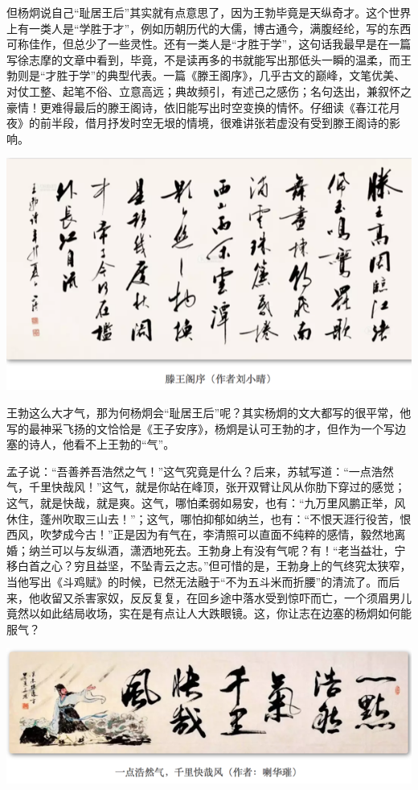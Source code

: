 \documentclass[]{book}
\begin{document}
但杨炯说自己``耻居王后''其实就有点意思了，因为王勃毕竟是天纵奇才。这个世界上有一类人是``学胜于才''，例如历朝历代的大儒，博古通今，满腹经纶，写的东西可称佳作，但总少了一些灵性。还有一类人是``才胜于学''，这句话我最早是在一篇写徐志摩的文章中看到，毕竟，不是读再多的书就能写出那低头一瞬的温柔，而王勃则是``才胜于学''的典型代表。一篇《滕王阁序》，几乎古文的巅峰，文笔优美、对仗工整、起笔不俗、立意高远；典故频引，有述己之感伤；名句迭出，兼叙怀之豪情！更难得最后的滕王阁诗，依旧能写出时空变换的情怀。仔细读《春江花月夜》的前半段，借月抒发时空无垠的情境，很难讲张若虚没有受到滕王阁诗的影响。

\includegraphics[width=8.33in]{images/ctsj5}

王勃这么大才气，那为何杨炯会``耻居王后''呢？其实杨炯的文大都写的很平常，他写的最神采飞扬的文恰恰是《王子安序》，杨炯是认可王勃的才，但作为一个写边塞的诗人，他看不上王勃的``气''。

孟子说：``吾善养吾浩然之气！''这气究竟是什么？后来，苏轼写道：``一点浩然气，千里快哉风！''这气，就是你站在峰顶，张开双臂让风从你肋下穿过的感觉；这气，就是快哉，就是爽。这气，哪怕柔弱如易安，也有：``九万里风鹏正举，风休住，蓬州吹取三山去！''；这气，哪怕抑郁如纳兰，也有：``不恨天涯行役苦，恨西风，吹梦成今古！''正是因为有气在，李清照可以直面不纯粹的感情，毅然地离婚；纳兰可以与友纵酒，潇洒地死去。王勃身上有没有气呢？有！``老当益壮，宁移白首之心？穷且益坚，不坠青云之志。''但可惜的是，王勃身上的气终究太狭窄，当他写出《斗鸡赋》的时候，已然无法融于``不为五斗米而折腰''的清流了。而后来，他收留又杀害家奴，反反复复，在回乡途中落水受到惊吓而亡，一个须眉男儿竟然以如此结局收场，实在是有点让人大跌眼镜。这，你让志在边塞的杨炯如何能服气？

\includegraphics[width=8.33in]{images/ctsj6}
\end{document}
